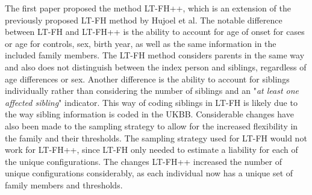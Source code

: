 The first paper proposed the method LT-FH++, which is an extension of the previously proposed LT-FH method by Hujoel et al\cite{hujoel2020liability}. The notable difference between LT-FH and LT-FH++ is the ability to account for age of onset for cases or age for controls, sex, birth year, as well as the same information in the included family members. The LT-FH method considers parents in the same way and also does not distinguish between the index person and siblings, regardless of age differences or sex. Another difference is the ability to account for siblings individually rather than considering the number of siblings and an "\textit{at least one affected sibling}" indicator. This way of coding siblings in LT-FH is likely due to the way sibling information is coded in the UKBB. Considerable changes have also been made to the sampling strategy to allow for the increased flexibility in the family and their thresholds. The sampling strategy used for LT-FH would not work for LT-FH++, since LT-FH only needed to estimate a liability for each of the unique configurations. The changes LT-FH++ increased the number of unique configurations considerably, as each individual now has a unique set of family members and thresholds. 

